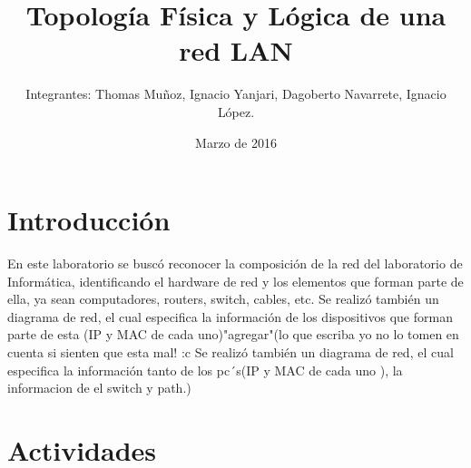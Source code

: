 \documentclass{udpreport}
\title{Topología Física y Lógica de una red LAN}
\author{Integrantes: Thomas Muñoz, Ignacio Yanjari, Dagoberto Navarrete, Ignacio López.}
\date{Marzo de 2016}
\begin{document}
\maketitle
\tableofcontents %
\chapter{Introducción}
En este laboratorio se buscó reconocer la composición de la red del laboratorio de Informática, identificando el hardware de red y los elementos que forman parte de ella, ya sean computadores, routers, switch, cables, etc. Se realizó también un diagrama de red, el cual especifica la información de los dispositivos que forman parte de esta (IP y MAC de cada uno)"agregar"(lo que escriba yo no lo tomen en cuenta si sienten que esta mal! :c  Se realizó también un diagrama de red, el cual especifica la información tanto de los pc´s(IP y MAC de cada uno ), la informacion de el switch y path.)
\chapter{Actividades}
\end{document}
